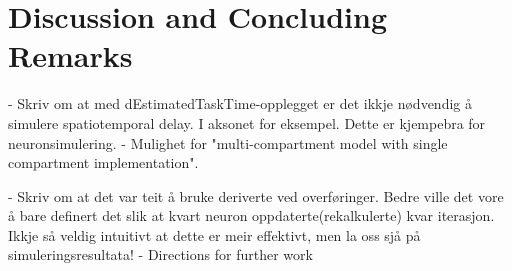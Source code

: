\documentclass[b5paper,12 pt]{report}
\begin{document}


		



	\chapter{Discussion and Concluding Remarks}
	\label{chDiscussion}
 		- Skriv om at med dEstimatedTaskTime-opplegget er det ikkje nødvendig å simulere spatiotemporal delay. I aksonet for eksempel. Dette er kjempebra for neuronsimulering.
		- Mulighet for "multi-compartment model with single compartment implementation".
		
		- Skriv om at det var teit å bruke deriverte ved overføringer. Bedre ville det vore å bare definert det slik at kvart neuron oppdaterte(rekalkulerte) kvar iterasjon. 
			Ikkje så veldig intuitivt at dette er meir effektivt, men la oss sjå på simuleringsresultata!
		- Directions for further work
\end{document}

